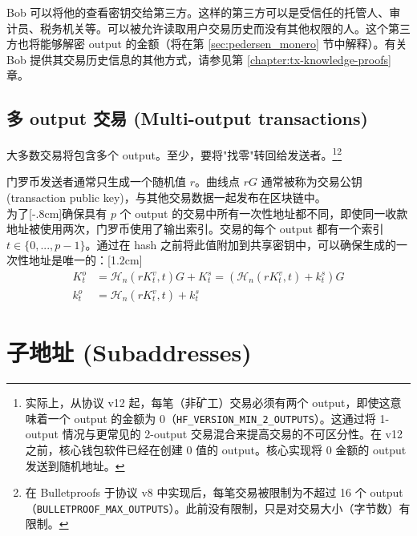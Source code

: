 Bob 可以将他的查看密钥交给第三方。这样的第三方可以是受信任的托管人、审计员、税务机关等。可以被允许读取用户交易历史而没有其他权限的人。这个第三方也将能够解密 output 的金额（将在第 \ref{sec:pedersen_monero} 节中解释）。有关 Bob 提供其交易历史信息的其他方式，请参见第 \ref{chapter:tx-knowledge-proofs} 章。


\subsection{多 output 交易 (Multi-output transactions)}
\label{sec:multi_out_transactions}

大多数交易将包含多个 output。至少，要将"找零"转回给发送者。\footnote{实际上，从协议 v12 起，每笔（非矿工）交易{必须}有两个 output，即使这意味着一个 output 的金额为 0（{\tt HF\_VERSION\_MIN\_2\_OUTPUTS}）。这通过将 1-output 情况与更常见的 2-output 交易混合来提高交易的不可区分性。在 v12 之前，核心钱包软件已经在创建 0 值的 output。核心实现将 0 金额的 output 发送到随机地址。}\footnote{在 Bulletproofs 于协议 v8 中实现后，每笔交易被限制为不超过 16 个 output（{\tt BULLETPROOF\_MAX\_OUTPUTS}）。此前没有限制，只是对交易大小（字节数）有限制。}%

门罗币发送者通常只生成一个随机值 $r$。曲线点 $r G$ 通常被称为{交易公钥 (transaction public key)}，与其他交易数据一起发布在区块链中。\\

为了[-.8cm]确保具有 $p$ 个 output 的交易中所有一次性地址都不同，即使同一收款地址被使用两次，门罗币使用了输出索引。交易的每个 output 都有一个索引 $t \in \{0, ..., p-1\}$。通过在 hash 之前将此值附加到共享密钥中，可以确保生成的一次性地址是唯一的：[1.2cm]\vspace{.175cm}%
\begin{align*}
  K_t^o &= \mathcal{H}_n(r K_t^v, t)G + K_t^s = (\mathcal{H}_n(r K_t^v, t) + k_t^s)G  \\ 
  k_t^o &= \mathcal{H}_n(r K_t^v, t) + k_t^s
\end{align*} 



\section{子地址 (Subaddresses)}
\label{sec:subaddresses}

